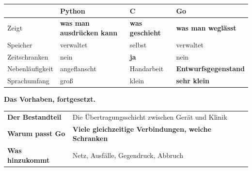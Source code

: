 \begin{merksatz}
\begin{center}
{\small
\renewcommand{\arraystretch}{1.5}
\begin{tabular}{@{}P{2.6cm}P{2.4cm}P{1.8cm}P{2.2cm}@{}}
\toprule
& \textbf{Python} & \textbf{C} & \textbf{Go}\\
\midrule
Zeigt & \textbf{was man ausdrücken kann} & \textbf{was geschieht} & \textbf{was man weglässt}\\
Speicher & \textcolor{gruen}{verwaltet} & \textcolor{akzent}{selbst} & \textcolor{gruen}{verwaltet}\\
Zeitschranken & \textcolor{akzent}{nein} & \textcolor{gruen}{\textbf{ja}} & \textcolor{akzent}{nein}\\
Nebenläufigkeit & \textcolor{akzent}{angeflanscht} & \textcolor{akzent}{Hand\-arbeit} & \textcolor{gruen}{\textbf{Entwurfs\-gegenstand}}\\
Sprachumfang & groß & klein & \textcolor{gruen}{\textbf{sehr klein}}\\
\bottomrule
\end{tabular}}
\end{center}

\begin{center}
\begin{minipage}{0.88\textwidth}
\end{minipage}
\end{center}

\textbf{Das Vorhaben, fortgesetzt.}

\begin{center}
\renewcommand{\arraystretch}{1.5}
\begin{tabular}{@{}P{2.8cm}P{6.2cm}@{}}
\toprule
\textbf{Der Bestandteil} & Die Übertragungsschicht zwischen Gerät und Klinik\\
\textbf{Warum passt Go} & \textbf{Viele gleichzeitige Verbindungen, weiche Schranken}\\
\textbf{Was hinzukommt} & Netz, Ausfälle, Gegendruck, Abbruch\\
\bottomrule
\end{tabular}
\end{center}

\begin{center}
\end{center}
\end{merksatz}

